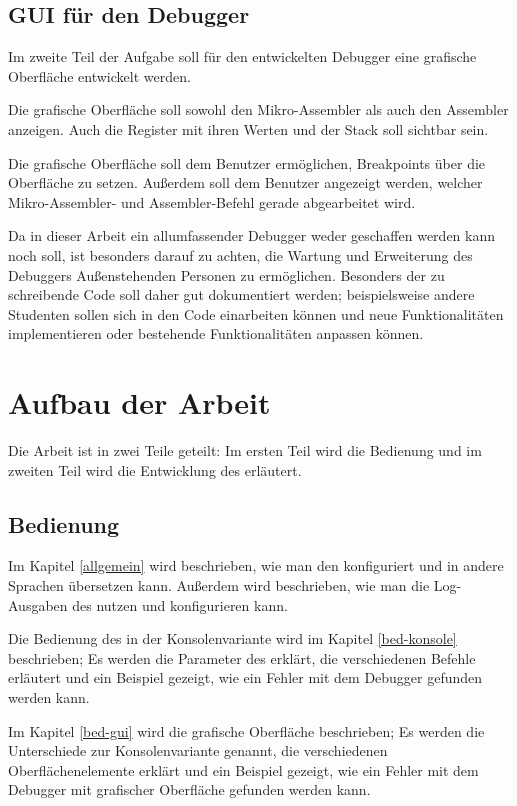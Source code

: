 \subsection*{GUI für den Debugger}
Im zweite Teil der Aufgabe soll für den entwickelten Debugger eine grafische  Oberfläche entwickelt werden.

Die grafische Oberfläche soll sowohl den Mikro-Assembler als auch den Assembler anzeigen. Auch die Register mit ihren Werten und der Stack soll sichtbar sein.

Die grafische Oberfläche soll dem Benutzer ermöglichen, Breakpoints über die Oberfläche zu setzen. Außerdem soll dem Benutzer angezeigt werden, welcher Mikro-Assembler- und Assembler-Befehl gerade abgearbeitet wird.

Da in dieser Arbeit ein allumfassender Debugger weder geschaffen werden kann noch soll, ist besonders darauf zu achten, die Wartung und Erweiterung des Debuggers Außenstehenden Personen zu ermöglichen. Besonders der zu schreibende Code soll daher gut dokumentiert werden; beispielsweise andere Studenten sollen sich in den Code einarbeiten können und neue Funktionalitäten implementieren oder bestehende Funktionalitäten anpassen können.

\section*{Aufbau der Arbeit}
Die Arbeit ist in zwei Teile geteilt: Im ersten Teil wird die Bedienung und im zweiten Teil wird die Entwicklung des \md{} erläutert.

\subsection*{Bedienung}
Im Kapitel \ref{allgemein} wird beschrieben, wie man den \md{} konfiguriert und in andere Sprachen übersetzen kann. Außerdem wird beschrieben, wie man die Log-Ausgaben des \md{} nutzen und konfigurieren kann.

Die Bedienung des \md{} in der Konsolenvariante wird im Kapitel \ref{bed-konsole} beschrieben; Es werden die Parameter des \md{} erklärt, die verschiedenen Befehle erläutert und ein Beispiel gezeigt, wie ein Fehler mit dem Debugger gefunden werden kann.

Im Kapitel \ref{bed-gui} wird die grafische Oberfläche beschrieben; Es werden die Unterschiede zur Konsolenvariante genannt, die verschiedenen Oberflächenelemente erklärt und ein Beispiel gezeigt, wie ein Fehler mit dem Debugger mit grafischer Oberfläche gefunden werden kann.

